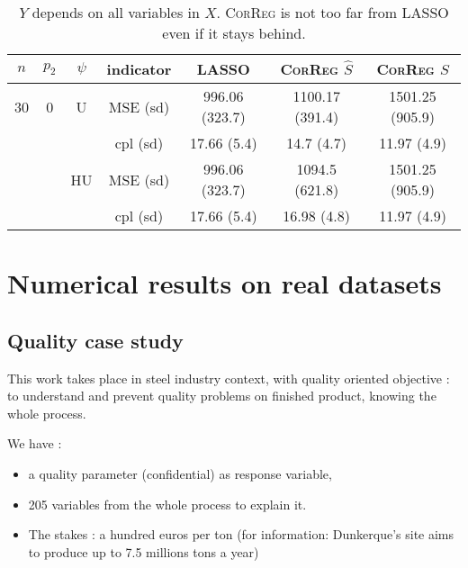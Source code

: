 \documentclass[11pt,a4paper]{article}
\begin{document}
\begin{table}[h!]
\centering
\begin{tabular}{|c|c|c|c|c|c|c|}
\hline 
$n$ & $p_2$&  $\psi$ &indicator &LASSO  &    \textsc{CorReg} $\hat S$& \textsc{CorReg} $S$\\ 
\hline %
30 & 0 & U&MSE (sd) & 996.06 (323.7) & 1100.17 (391.4) & 1501.25 (905.9) \\
& & &cpl (sd) & 17.66 (5.4) & 14.7 (4.7) & 11.97 (4.9) \\
 &  &HU &MSE (sd) & 996.06 (323.7) & 1094.5 (621.8) & 1501.25 (905.9) \\
& & & cpl (sd) & 17.66 (5.4) & 16.98 (4.8) & 11.97 (4.9) \\ 
\hline
\end{tabular} 
\caption{ $Y$ depends on all variables in $X$. \textsc{CorReg} is not too far from LASSO even if it stays behind. } \label{resYnonlin}
\end{table}


	\clearpage	
\section{Numerical results on real datasets} \label{sectionrealcase}
\subsection{Quality case study} \label{sectionexfos}
This work takes place in steel industry context, with quality oriented objective : to understand and prevent quality problems on finished product, knowing the whole process. 
		
We have :
		\begin{itemize}
			\item a quality parameter (confidential) as response variable,
			\item 205 variables from the whole process to explain it.
			\item The stakes : a hundred euros per ton (for information: Dunkerque's  site aims to produce up to 7.5 millions tons a year)
		\end{itemize}
		
\end{document}
